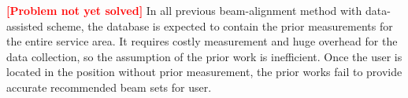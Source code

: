 \documentclass[12pt, draftcls, onecolumn]{IEEEtran}
\theoremstyle{plain}
\theoremstyle{definition}
\theoremstyle{remark}
\newcommand{\nt}[1]{\textcolor{red}{\textbf{[#1]}}}
\begin{document}
%



\nt{Problem not yet solved} In all previous beam-alignment method with data-assisted scheme, the database is expected to contain the prior measurements for the entire service area.
It requires costly measurement and huge overhead for the data collection, so the assumption of the prior work is inefficient.
Once the user is located in the position without prior measurement, the prior works fail to provide accurate recommended beam sets for user.


\end{document}
